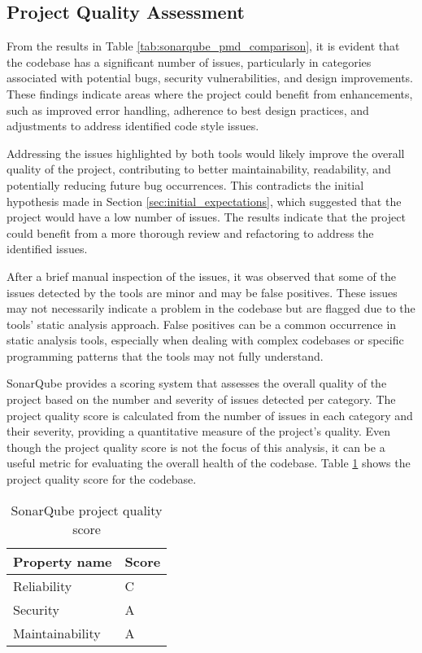 \subsection{Project Quality Assessment}

From the results in Table \ref{tab:sonarqube_pmd_comparison}, it is evident that the codebase has a significant number of issues, particularly in categories associated with potential bugs, security vulnerabilities, and design improvements. These findings indicate areas where the project could benefit from enhancements, such as improved error handling, adherence to best design practices, and adjustments to address identified code style issues.

Addressing the issues highlighted by both tools would likely improve the overall quality of the project, contributing to better maintainability, readability, and potentially reducing future bug occurrences. This contradicts the initial hypothesis made in Section \ref{sec:initial_expectations}, which suggested that the project would have a low number of issues. The results indicate that the project could benefit from a more thorough review and refactoring to address the identified issues.

After a brief manual inspection of the issues, it was observed that some of the issues detected by the tools are minor and may be false positives. These issues may not necessarily indicate a problem in the codebase but are flagged due to the tools' static analysis approach. False positives can be a common occurrence in static analysis tools, especially when dealing with complex codebases or specific programming patterns that the tools may not fully understand.

SonarQube provides a scoring system that assesses the overall quality of the project based on the number and severity of issues detected per category. The project quality score is calculated from the number of issues in each category and their severity, providing a quantitative measure of the project's quality. Even though the project quality score is not the focus of this analysis, it can be a useful metric for evaluating the overall health of the codebase. Table \ref{tab:sonar_project_quality} shows the project quality score for the codebase.

\begin{table}[H]
  \caption{SonarQube project quality score}
  \label{tab:sonar_project_quality}
  \begin{center}
    \begin{tabular}[c]{l|l}
      \hline
      \multicolumn{1}{c|}{\textbf{Property name}} & 
      \multicolumn{1}{c}{\textbf{Score}} \\
      \hline
      Reliability & C \\
      Security & A \\
      Maintainability & A \\
      \hline
    \end{tabular}
  \end{center}
\end{table}

